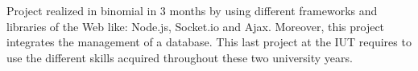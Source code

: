 \documentclass[10pt,a4paper,ragged2e,withhyper]{altacv}
\begin{document}
\begin{paracol}{2}
            
            Project realized in binomial in 3 months by using different frameworks and libraries of the Web like: Node.js, Socket.io and Ajax. Moreover, this project integrates the management of a database.  This last project at the IUT requires to use the different skills acquired throughout these two university years. 
    \end{paracol}
\end{document}
